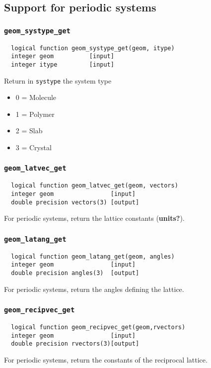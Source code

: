 \subsection{Support for periodic systems}

\subsubsection{{\tt geom\_systype\_get}}
\begin{verbatim}
  logical function geom_systype_get(geom, itype)
  integer geom          [input]
  integer itype         [input]
\end{verbatim}
Return in {\tt systype} the system type
\begin{itemize}
\item 0 = Molecule
\item 1 = Polymer
\item 2 = Slab
\item 3 = Crystal
\end{itemize}

\subsubsection{{\tt geom\_latvec\_get}}
\begin{verbatim}
  logical function geom_latvec_get(geom, vectors)
  integer geom                [input]
  double precision vectors(3) [output]
\end{verbatim}
For periodic systems, return the lattice constants ({\bf units?}).

\subsubsection{{\tt geom\_latang\_get}}
\begin{verbatim}
  logical function geom_latang_get(geom, angles)
  integer geom                [input]
  double precision angles(3)  [output]
\end{verbatim}
For periodic systems, return the angles defining the lattice.

\subsubsection{{\tt geom\_recipvec\_get}}
\begin{verbatim}
  logical function geom_recipvec_get(geom,rvectors)
  integer geom                [input]
  double precision rvectors(3)[output]
\end{verbatim}
For periodic systems, return the constants of the reciprocal lattice.

